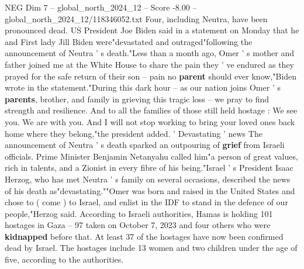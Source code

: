 \begin{textsample}{NEG Dim 7 – global\_north\_2024\_12 – Score -8.00 – global\_north\_2024\_12/118346052.txt}
Four, including Neutra, have been pronounced dead.
US President Joe Biden said in a statement on Monday that he and First lady Jill Biden were"devastated and outraged"following the announcement of Neutra ' s death."Less than a month ago, Omer ' s mother and father joined me at the White House to share the pain they ' ve endured as they prayed for the safe return of their son -- pain no \textbf{parent} should ever know,"Biden wrote in the statement."During this dark hour -- as our nation joins Omer ' s \textbf{parents}, brother, and family in grieving this tragic loss -- we pray to find strength and resilience.
And to all the families of those still held hostage : We see you.
We are with you.
And I will not stop working to bring your loved ones back home where they belong,"the president added. ' Devastating ' news The announcement of Neutra ' s death sparked an outpouring of \textbf{grief} from Israeli officials.
Prime Minister Benjamin Netanyahu called him"a person of great values, rich in talents, and a Zionist in every fibre of his being."Israel ' s President Isaac Herzog, who has met Neutra ' s family on several occasions, described the news of his death as"devastating.""Omer was born and raised in the United States and chose to ( come ) to Israel, and enlist in the IDF to stand in the defence of our people,"Herzog said.
According to Israeli authorities, Hamas is holding 101 hostages in Gaza -- 97 taken on October 7, 2023 and four others who were \textbf{kidnapped} before that.
At least 37 of the hostages have now been confirmed dead by Israel.
The hostages include 13 women and two children under the age of five, according to the authorities.

\end{textsample}
